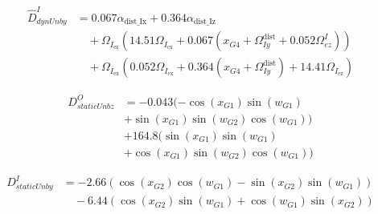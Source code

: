 \documentclass[letterpaper, 10 pt, conference]{ieeeconf}  %
\begin{document}
\begin{equation}
  \begin{aligned}
    \hat{D}^I_{dynUnby} & = 0.067\alpha_{\text{dist\_Ix}} + 0.364\alpha_{\text{dist\_Iz}}                                                                        \\
                        & \quad + \Omega_{I_{\text{ez}}}(14.51\Omega_{I_{\text{ex}}} + 0.067(x_{G4} + \Omega^{\text{dist}}_{Iy} + 0.052\Omega^I_{ez}))           \\
                        & \quad + \Omega_{I_{\text{ex}}}(0.052\Omega_{I_{\text{ex}}} + 0.364(x_{G4} + \Omega^{\text{dist}}_{Iy}) + 14.41\Omega_{I_{\text{ez}}})
  \end{aligned}
\end{equation}

\begin{equation}
  \begin{aligned}
    D^O_{staticUnbz} & = -0.043(-\cos(x_{G1})\sin(w_{G1})       \\  
                     & + \sin(x_{G1})\sin(w_{G2})\cos(w_{G1}))  \\
                     & + 164.8(\sin(x_{G1})\sin(w_{G1})         \\ 
                     & + \cos(x_{G1})\sin(w_{G2})\cos(w_{G1}))
  \end{aligned}
\end{equation}

\begin{equation}
  \begin{aligned}
    D^I_{staticUnby} & = -2.66(\cos(x_{G2})\cos(w_{G1}) - \sin(x_{G2})\sin(w_{G1}))       \\
                     & \quad - 6.44(\cos(x_{G2})\sin(w_{G1}) + \cos(w_{G1})\sin(x_{G2}))
  \end{aligned}
\end{equation}
\end{document}

